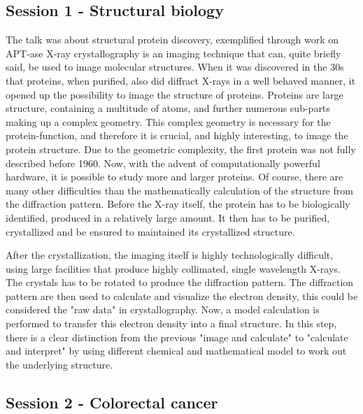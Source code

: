 \documentclass[12p]{article}
\begin{document}
\subsection*{Session 1 - Structural biology}

The talk was about structural protein discovery, exemplified through work on APT-ase
X-ray crystallography is an imaging technique that can, quite briefly said, be used to image molecular structures.
When it was discovered in the 30s that proteins, when purified, also did diffract X-rays in a well behaved manner, it opened up the possibility to image the structure of proteins.
Proteins are large structure, containing a multitude of atoms, and further numerous sub-parts making up a complex geometry.
This complex geometry is necessary for the protein-function, and therefore it is crucial, and highly interesting, to image the protein structure.
Due to the geometric complexity, the first protein was not fully described before 1960.
Now, with the advent of computationally  powerful hardware, it is possible to study more and larger proteins.
Of course, there are many other difficulties than the mathematically calculation of the structure from the diffraction pattern.
Before the X-ray itself, the protein has to be biologically identified, produced in a relatively large amount.
It then has to be purified, crystallized and be ensured to maintained its crystallized structure.

After the crystallization, the imaging itself is highly technologically difficult, using large facilities that produce highly collimated, single wavelength X-rays.
The crystals has to be rotated to produce the diffraction pattern.
The diffraction pattern are then used to calculate and visualize the electron density, this could be considered the "raw data" in crystallography.
Now, a model calculation is performed to transfer this electron density into a final structure.
In this step, there is a clear distinction from the previous "image and calculate" to "calculate and interpret" by using different chemical and mathematical model to work out the underlying structure.

\subsection*{Session 2 - Colorectal cancer}
\end{document}
